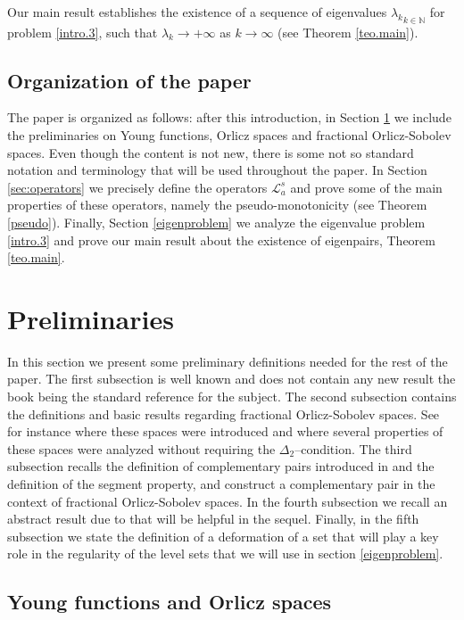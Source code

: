 \documentclass{amsart}
\newcommand{\A}{\mathcal{L}_a^s}
\newcommand{\N}{{\mathbb N}}
\theoremstyle{remark}
\theoremstyle{definition}
\numberwithin{equation}{section}
\begin{document}
Our main result establishes the existence of a sequence of eigenvalues ${\lambda_k}_{k\in\N}$ for problem \eqref{intro.3}, such that $\lambda_k \to +\infty$ as $k\to\infty$ (see Theorem \ref{teo.main}).

\subsection*{Organization of the paper}
The paper is organized as follows: after this introduction, in Section \ref{prel} we include the preliminaries on Young functions, Orlicz spaces and fractional Orlicz-Sobolev spaces. Even though the content is not new, there is some not so standard notation and terminology that will be used throughout the paper. In Section \ref{sec:operators} we precisely define the operators $\A$ and prove some of the main properties of these operators, namely the pseudo-monotonicity (see Theorem \ref{pseudo}). Finally, Section \ref{eigenproblem} we analyze the eigenvalue problem \eqref{intro.3} and prove our main result about the existence of eigenpairs, Theorem \ref{teo.main}.

\section{Preliminaries}\label{prel}

In this section we present some preliminary definitions needed for the rest of the paper. The first subsection is well known and does not contain any new result the book \cite{KR} being the standard reference for the subject. The second subsection contains the definitions and basic results regarding fractional Orlicz-Sobolev spaces. See for instance \cite{FBS} where these spaces were introduced and \cite{ACPS2, ACPS} where several properties of these spaces were analyzed without requiring the $\Delta_2$--condition. The third subsection recalls the definition of complementary pairs introduced in \cite{Gossez} and the definition of the segment property, and construct a complementary pair in the context of fractional Orlicz-Sobolev spaces.  In the fourth subsection we recall an abstract result due to \cite{Ti} that will be helpful in the sequel. Finally, in the fifth subsection we state the definition of a deformation of a set that will play a key role in the regularity of the level sets that we will use in section \ref{eigenproblem}.  

\subsection{Young functions and Orlicz spaces}
\end{document}
